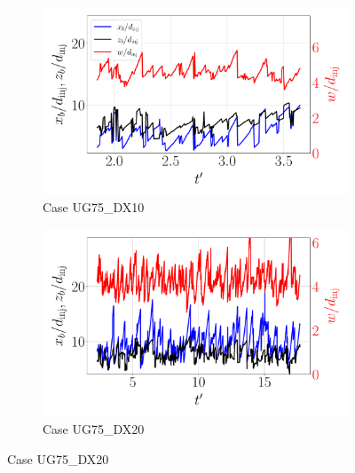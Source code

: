 
\begin{figure}[ht]
\flushleft
\begin{subfigure}[b]{0.45\textwidth}
	\centering
   \includegraphics[scale=0.25]{./part2_developments/figures_ch5_resolved_JICF/results_dense_core_modeling/instant_xb_zb_w_UG75_DX10}
   \vspace*{-0.3in}
   \caption{Case UG75\_DX10}
   \label{fig:instant_xb_zb_w_UG75_DX10} 
\end{subfigure}
\hfill
\begin{subfigure}[b]{0.45\textwidth}
	\centering
   \includegraphics[scale=0.25]{./part2_developments/figures_ch5_resolved_JICF/results_dense_core_modeling/instant_xb_zb_w_UG75_DX20}
   \vspace*{-0.3in}
   \caption{Case UG75\_DX20}
   \label{fig:instant_xb_zb_w_UG75_DX20}
\end{subfigure}


\end{figure}
